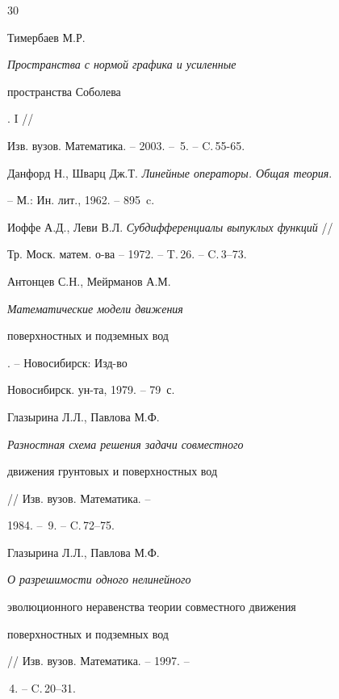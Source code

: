 \begin{thebibliography}{30}







Тимербаев М.Р. {\em Пространства с нормой графика и усиленные


пространства Соболева}. I //


Изв. вузов. Математика. -- 2003. -- \No\,5. -- C.\,55-65.







Данфорд Н., Шварц Дж.Т. {\em Линейные операторы. Общая теория}.


-- М.: Ин. лит., 1962. -- 895~c.







Иоффе А.Д., Леви В.Л. {\em Субдифференциалы выпуклых функций} //


Тр. Моск. матем. о-ва -- 1972. -- T.\,26. -- C.\,3--73.







Антонцев С.Н., Мейрманов А.М. {\em Математические модели движения


поверхностных и подземных вод}. -- Новосибирск: Изд-во


Новосибирск. ун-та, 1979. -- 79~с.







Глазырина Л.Л., Павлова М.Ф. {\em Разностная схема решения задачи совместного


движения грунтовых и поверхностных вод} // Изв. вузов. Математика. --


1984. -- \No\,9. -- C.\,72--75.







Глазырина Л.Л., Павлова М.Ф. {\em О разрешимости одного нелинейного


эволюционного неравенства теории совместного движения


поверхностных и подземных вод} // Изв. вузов. Математика. -- 1997. --


\No\,4. -- C.\,20--31.






\end{thebibliography}
